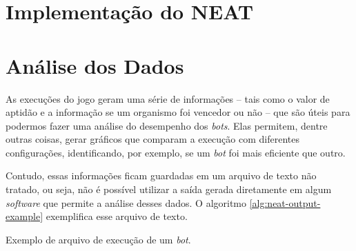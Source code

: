 \section{\label{section:neat-details}Implementação do NEAT}


\section{\label{section:analytics}Análise dos Dados}

As execuções do jogo geram uma série de informações -- tais como o valor de
aptidão e a informação se um organismo foi vencedor ou não -- que são úteis
para podermos fazer uma análise do desempenho dos \textit{bots}. Elas permitem,
dentre outras coisas, gerar gráficos que comparam a execução com diferentes
configurações, identificando, por exemplo, se um \textit{bot} foi mais
eficiente que outro.

Contudo, essas informações ficam guardadas em um arquivo de texto não tratado,
ou seja, não é possível utilizar a saída gerada diretamente em algum
\textit{software} que permite a análise desses dados. O algoritmo
\ref{alg:neat-output-example} exemplifica esse arquivo de texto.

\begin{algorithm}[H]

\caption[Exemplo de arquivo de execução de um \textit{bot}.]
{\label{alg:neat-output-example}Exemplo de arquivo de execução de um
    \textit{bot}.}
\end{algorithm}


